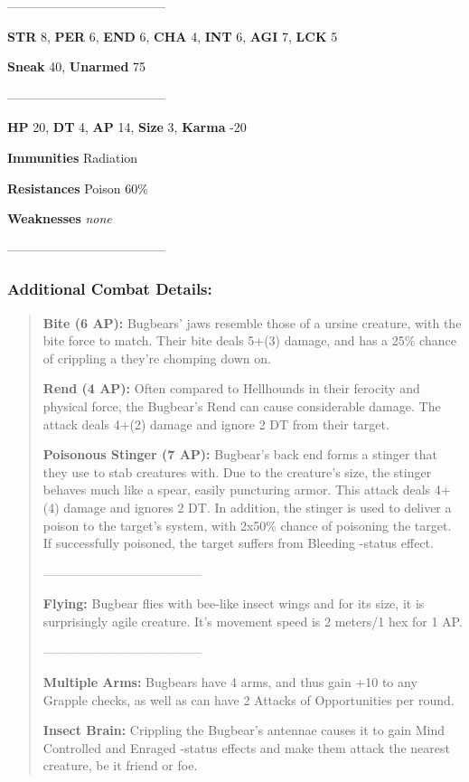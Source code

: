 \documentclass[11pt,a4paper,twocolumn]{book}
\begin{document}
		--------------------------------------
		
		\noindent
		\textbf{STR} 8, \textbf{PER} 6, \textbf{END} 6, \textbf{CHA} 4, \textbf{INT} 6, \textbf{AGI} 7, \textbf{LCK} 5
		
		\noindent
		\textbf{Sneak} 40, \textbf{Unarmed} 75
		
		--------------------------------------
		
		\noindent
		\textbf{HP} 20, \textbf{DT} 4, \textbf{AP} 14, \textbf{Size} 3, \textbf{Karma} -20
		
		
		\noindent
		\textbf{Immunities} Radiation
		
		\noindent
		\textbf{Resistances} Poison 60\%
		
		\noindent
		\textbf{Weaknesses} \emph{none} %
		
		--------------------------------------
	
	
	\subsubsection*{Additional Combat Details:}
	\begin{verse}
		\textbf{Bite (6 AP):} Bugbears' jaws resemble those of a ursine creature, with the bite force to match. Their bite deals 5+(3) damage, and has a 25\% chance of crippling a they're chomping down on.
		
		\textbf{Rend (4 AP):} Often compared to Hellhounds in their ferocity and physical force, the Bugbear's Rend can cause considerable damage. The attack deals 4+(2) damage and ignore 2 DT from their target.
		
		\textbf{Poisonous Stinger (7 AP):} Bugbear's back end forms a stinger that they use to stab creatures with. Due to the creature's size, the stinger behaves much like a spear, easily puncturing armor. This attack deals 4+(4) damage and ignores 2 DT. In addition, the stinger is used to deliver a poison to the target's system, with 2x50\% chance of poisoning the target. If successfully poisoned, the target suffers from Bleeding -status effect.
		
		--------------------------------------
		
		\textbf{Flying:} Bugbear flies with bee-like insect wings and for its size, it is surprisingly agile creature. It's movement speed is 2 meters/1 hex for 1 AP.
		
		--------------------------------------
		
		\textbf{Multiple Arms:} Bugbears have 4 arms, and thus gain +10 to any Grapple checks, as well as can have 2 Attacks of Opportunities per round.
		
		\textbf{Insect Brain:} Crippling the Bugbear's antennae causes it to gain Mind Controlled and Enraged -status effects and make them attack the nearest creature, be it friend or foe.
		
	\end{verse}
	
\end{document}
